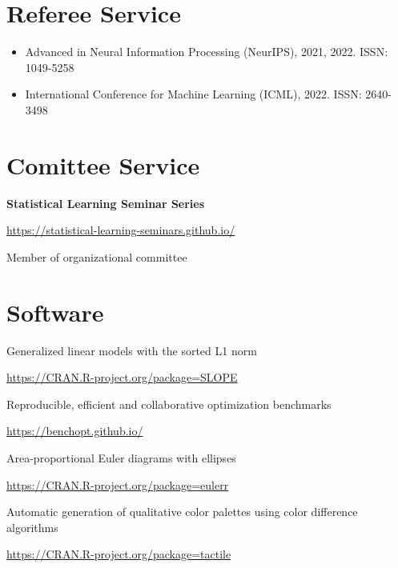 \documentclass[
  10pt,
  headsepline=true,
  english,
  DIV=12
]{scrartcl}
\renewcommand*{%
  \mkbibnamegiven
}[1]{\ifitemannotation{highlight}{\textbf{#1}}{#1}}
\renewcommand*{%
  \mkbibnamefamily
}[1]{\ifitemannotation{highlight}{\textbf{#1}}{#1}}
\begin{document}
\section{Referee Service}

\begin{itemize}
  \item Advanced in Neural Information Processing (NeurIPS), 2021, 2022. ISSN: 1049-5258
  \item International Conference for Machine Learning (ICML), 2022. ISSN: 2640-3498
\end{itemize}


\section{Comittee Service}

\begin{description}[
    labelwidth = \widthof{2020 -- now} + 1em,
    leftmargin = \widthof{2020 -- now} + 1em,
  ]
  \item[2020 -- now]{
              \textbf{Statistical Learning Seminar Series}

              \url{https://statistical-learning-seminars.github.io/}

              Member of organizational committee
        }
\end{description}

\section{Software}

\begin{description}[
    labelwidth = \widthof{qualpalr} + 1em,
    leftmargin = \widthof{qualpalr} + 1em,
  ]
  \item[SLOPE] {
    Generalized linear models with the sorted L1 norm

    \url{https://CRAN.R-project.org/package=SLOPE}
    }


  \item[benchopt]{
    Reproducible, efficient and collaborative optimization benchmarks

    \url{https://benchopt.github.io/}
  }

  \item[eulerr]{
    Area-proportional Euler diagrams with ellipses

    \url{https://CRAN.R-project.org/package=eulerr}
  }

  \item[qualpalr] {
    Automatic generation of qualitative color palettes using color difference
    algorithms

    \url{https://CRAN.R-project.org/package=tactile}
  }

\end{description}
\end{document}
